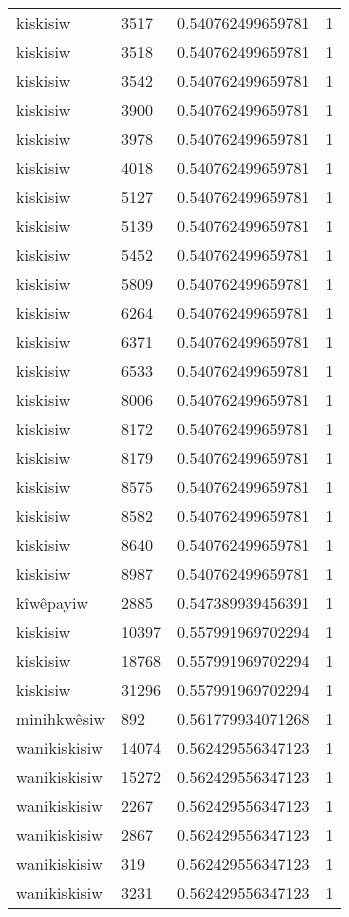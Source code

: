 \begin{longtable}{llll}
kiskisiw & 3517 & 0.540762499659781 & 1 \\
kiskisiw & 3518 & 0.540762499659781 & 1 \\
kiskisiw & 3542 & 0.540762499659781 & 1 \\
kiskisiw & 3900 & 0.540762499659781 & 1 \\
kiskisiw & 3978 & 0.540762499659781 & 1 \\
kiskisiw & 4018 & 0.540762499659781 & 1 \\
kiskisiw & 5127 & 0.540762499659781 & 1 \\
kiskisiw & 5139 & 0.540762499659781 & 1 \\
kiskisiw & 5452 & 0.540762499659781 & 1 \\
kiskisiw & 5809 & 0.540762499659781 & 1 \\
kiskisiw & 6264 & 0.540762499659781 & 1 \\
kiskisiw & 6371 & 0.540762499659781 & 1 \\
kiskisiw & 6533 & 0.540762499659781 & 1 \\
kiskisiw & 8006 & 0.540762499659781 & 1 \\
kiskisiw & 8172 & 0.540762499659781 & 1 \\
kiskisiw & 8179 & 0.540762499659781 & 1 \\
kiskisiw & 8575 & 0.540762499659781 & 1 \\
kiskisiw & 8582 & 0.540762499659781 & 1 \\
kiskisiw & 8640 & 0.540762499659781 & 1 \\
kiskisiw & 8987 & 0.540762499659781 & 1 \\
kîwêpayiw & 2885 & 0.547389939456391 & 1 \\
kiskisiw & 10397 & 0.557991969702294 & 1 \\
kiskisiw & 18768 & 0.557991969702294 & 1 \\
kiskisiw & 31296 & 0.557991969702294 & 1 \\
minihkwêsiw & 892 & 0.561779934071268 & 1 \\
wanikiskisiw & 14074 & 0.562429556347123 & 1 \\
wanikiskisiw & 15272 & 0.562429556347123 & 1 \\
wanikiskisiw & 2267 & 0.562429556347123 & 1 \\
wanikiskisiw & 2867 & 0.562429556347123 & 1 \\
wanikiskisiw & 319 & 0.562429556347123 & 1 \\
wanikiskisiw & 3231 & 0.562429556347123 & 1 \\

\end{longtable}
